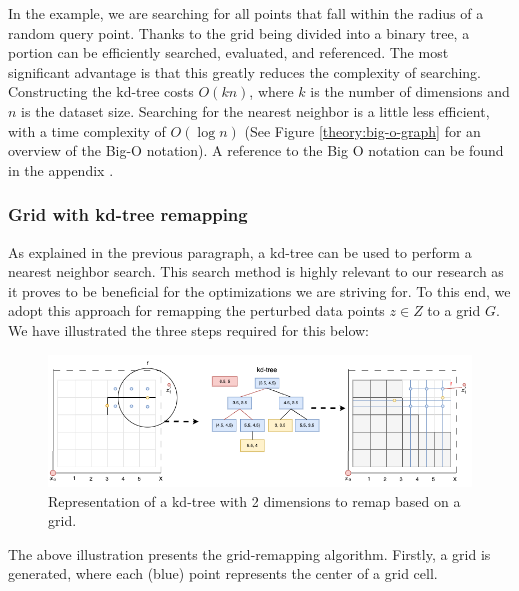 In the example, we are searching for all points that fall within the radius of a random query point.
Thanks to the grid being divided into a binary tree, a portion can be efficiently searched, evaluated, and referenced.
The most significant advantage is that this greatly reduces the complexity of searching.
Constructing the kd-tree costs $O(kn)$, where $k$ is the number of dimensions and $n$ is the dataset size.
Searching for the nearest neighbor is a little less efficient, with a time complexity of $O(\log n)$ \citep{washington_k-d_2002} (See Figure \ref{theory:big-o-graph} for an overview of the Big-O notation).
A reference to the Big O notation can be found in the appendix .
\subsubsection{Grid with kd-tree remapping} \label{theory:grid-remapping}
As explained in the previous paragraph, a kd-tree can be used to perform a nearest neighbor search.
This search method is highly relevant to our research as it proves to be beneficial for the optimizations we are striving for.
To this end, we adopt this approach for remapping the perturbed data points $z \in Z$ to a grid $G$. \newline
We have illustrated the three steps required for this below:
\begin{figure}[H]
  \includegraphics[width=1\textwidth]{TheorethicalFramework/ND-Laplace/Images/KD-tree.png}
  \caption{Representation of a kd-tree with 2 dimensions to remap based on a grid.}
  \label{fig:kd-tree}
\end{figure}
The above illustration presents the grid-remapping algorithm.
Firstly, a grid is generated, where each (blue) point represents the center of a grid cell.

